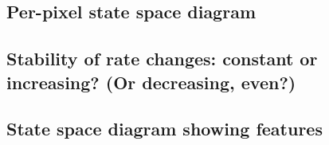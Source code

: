 \documentclass[10pt,fleqn]{article}
\begin{document}
\subsection{Per-pixel state space diagram}

\subsection{Stability of rate changes: constant or increasing? (Or decreasing, even?)}


\subsection{State space diagram showing features}


\end{document}
